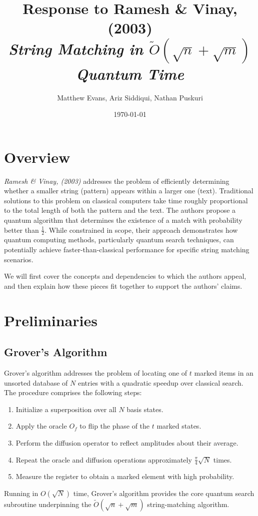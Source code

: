 \documentclass[12pt]{IEEEtran}
\title{\Large{Response to Ramesh \& Vinay, (2003)\\ \small{\textit{String Matching in \(\tilde{O}(\sqrt{n} + \sqrt{m})\) Quantum Time}} }}
\author{%
\normalsize{Matthew Evans, Ariz Siddiqui, Nathan Puskuri}
}
\date{\today}
\begin{document}
\maketitle

\section{Overview}
\textit{Ramesh \& Vinay, (2003)}\cite{RameshH2003SmiO} addresses the problem of efficiently determining whether a smaller string (pattern) appears within a larger one (text). Traditional solutions to this problem on classical computers take time roughly proportional to the total length of both the pattern and the text. The authors propose a quantum algorithm that determines the existence of a match with probability better than \(\frac{1}{2}\). While constrained in scope, their approach demonstrates how quantum computing methods, particularly quantum search techniques, can potentially achieve faster-than-classical performance for specific string matching scenarios.

We will first cover the concepts and dependencies to which the authors appeal, and then explain how these pieces fit together to support the authors' claims.

\section{Preliminaries}
\subsection{Grover's Algorithm}
Grover's algorithm \cite{grover1996fastquantummechanicalalgorithm} addresses the problem of locating one of \(t\) marked items in an unsorted database of \(N\) entries with a quadratic speedup over classical search. The procedure comprises the following steps:
\begin{enumerate}
  \item Initialize a superposition over all \(N\) basis states.
  \item Apply the oracle \(O_f\) to flip the phase of the \(t\) marked states.
  \item Perform the diffusion operator to reflect amplitudes about their average.
  \item Repeat the oracle and diffusion operations approximately \(\frac{\pi}{4}\sqrt{N}\) times.
  \item Measure the register to obtain a marked element with high probability.
\end{enumerate}
Running in \(O(\sqrt{N})\) time, Grover's algorithm provides the core quantum search subroutine underpinning the \(\widetilde{O}(\sqrt{n}+\sqrt{m})\) string-matching algorithm.
\end{document}
